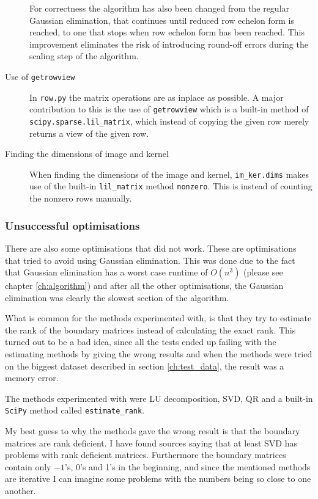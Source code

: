 \documentclass[11pt,a4paper,twoside]{report}
\begin{document}
\begin{description}
For correctness the algorithm has also been changed from the regular Gaussian elimination, that continues until reduced row echelon form is reached, to one that stops when row echelon form has been reached. This improvement eliminates the risk of introducing round-off errors during the scaling step of the algorithm.
\item[Use of \texttt{getrowview}] In \texttt{row.py} the matrix operations are as inplace as possible. A major contribution to this is the use of \texttt{getrowview} which is a built-in method of \texttt{scipy.sparse.lil\_matrix}, which instead of copying the given row merely returns a view of the given row. 
\item[Finding the dimensions of image and kernel] When finding the dimensions of the image and kernel, \texttt{im\_ker.dims} makes use of the built-in \texttt{lil\_matrix} method \texttt{nonzero}. This is instead of counting the nonzero rows manually.
\end{description}
\subsubsection{Unsuccessful optimisations}
There are also some optimisations that did not work. These are optimisations that tried to avoid using Gaussian elimination. This was done due to the fact that Gaussian elimination has a worst case runtime of $O(n^3)$ (please see chapter \ref{ch:algorithm}) and after all the other optimisations, the Gaussian elimination was clearly the slowest section of the algorithm.

What is common for the methods experimented with, is that they try to estimate the rank of the boundary matrices instead of calculating the exact rank. This turned out to be a bad idea, since all the tests ended up failing with the estimating methods by giving the wrong results and when the methods were tried on the biggest dataset described in section \ref{ch:test_data}, the result was a memory error. 

The methods experimented with were LU decomposition, SVD, QR and a built-in \texttt{SciPy} method called \texttt{estimate\_rank}.

My best guess to why the methods gave the wrong result is that the boundary matrices are rank deficient. I have found sources saying that at least SVD \cite{wikiSVD} has problems with rank deficient matrices. Furthermore the boundary matrices contain only $-1$'s, 0's and 1's in the beginning, and since the mentioned methods are iterative I can imagine some problems with the numbers being so close to one another.
\end{document}
